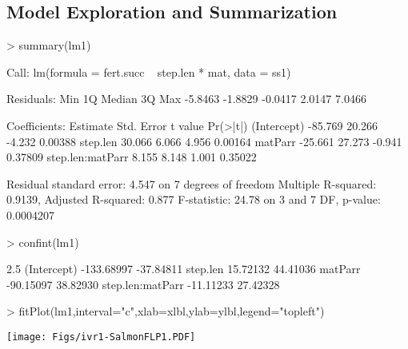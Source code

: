 \documentclass[a4paper]{article}
\begin{document}
\begin{Schunk}
\end{Schunk}


\subsection{Model Exploration and Summarization}
\begin{Schunk}
\begin{Sinput}
> summary(lm1)
\end{Sinput}
\begin{Soutput}
Call:
lm(formula = fert.succ ~ step.len * mat, data = ss1)

Residuals:
    Min      1Q  Median      3Q     Max 
-5.8463 -1.8829 -0.0417  2.0147  7.0466 

Coefficients:
                 Estimate Std. Error t value Pr(>|t|)
(Intercept)       -85.769     20.266  -4.232  0.00388
step.len           30.066      6.066   4.956  0.00164
matParr           -25.661     27.273  -0.941  0.37809
step.len:matParr    8.155      8.148   1.001  0.35022

Residual standard error: 4.547 on 7 degrees of freedom
Multiple R-squared: 0.9139,	Adjusted R-squared: 0.877 
F-statistic: 24.78 on 3 and 7 DF,  p-value: 0.0004207 
\end{Soutput}
\begin{Sinput}
> confint(lm1)
\end{Sinput}
\begin{Soutput}
                      2.5 %    97.5 %
(Intercept)      -133.68997 -37.84811
step.len           15.72132  44.41036
matParr           -90.15097  38.82930
step.len:matParr  -11.11233  27.42328
\end{Soutput}
\begin{Sinput}
> fitPlot(lm1,interval="c",xlab=xlbl,ylab=ylbl,legend="topleft")
\end{Sinput}
\end{Schunk}

\texttt{[image: Figs/ivr1-SalmonFLP1.PDF]}
\end{document}
